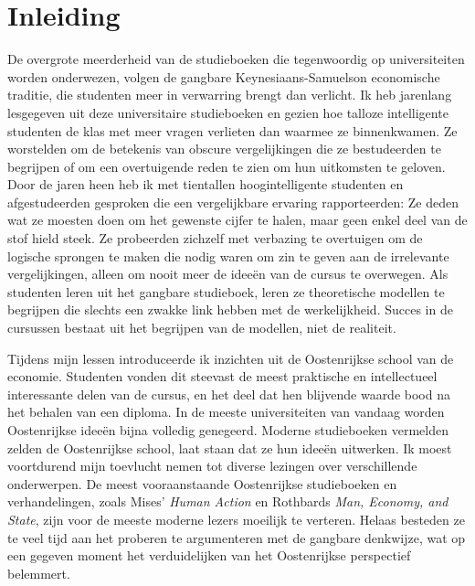\chapter{Inleiding}

De overgrote meerderheid van de studieboeken die tegenwoordig op universiteiten worden onderwezen, volgen de gangbare Keynesiaans-Samuelson economische traditie, die studenten meer in verwarring brengt dan verlicht. Ik heb jarenlang lesgegeven uit deze universitaire studieboeken en gezien hoe talloze intelligente studenten de klas met meer vragen verlieten dan waarmee ze binnenkwamen. Ze worstelden om de betekenis van obscure vergelijkingen die ze bestudeerden te begrijpen of om een overtuigende reden te zien om hun uitkomsten te geloven. Door de jaren heen heb ik met tientallen hoogintelligente studenten en afgestudeerden gesproken die een vergelijkbare ervaring rapporteerden: Ze deden wat ze moesten doen om het gewenste cijfer te halen, maar geen enkel deel van de stof hield steek. Ze probeerden zichzelf met verbazing te overtuigen om de logische sprongen te maken die nodig waren om zin te geven aan de irrelevante vergelijkingen, alleen om nooit meer de ideeën van de cursus te overwegen. Als studenten leren uit het gangbare studieboek, leren ze theoretische modellen te begrijpen die slechts een zwakke link hebben met de werkelijkheid. Succes in de cursussen bestaat uit het begrijpen van de modellen, niet de realiteit.

Tijdens mijn lessen introduceerde ik inzichten uit de Oostenrijkse school van de economie. Studenten vonden dit steevast de meest praktische en intellectueel interessante delen van de cursus, en het deel dat hen blijvende waarde bood na het behalen van een diploma. In de meeste universiteiten van vandaag worden Oostenrijkse ideeën bijna volledig genegeerd. Moderne studieboeken vermelden zelden de Oostenrijkse school, laat staan dat ze hun ideeën uitwerken. Ik moest voortdurend mijn toevlucht nemen tot diverse lezingen over verschillende onderwerpen. De meest vooraanstaande Oostenrijkse studieboeken en verhandelingen, zoals Mises' \textit{Human Action} en Rothbards \textit{Man, Economy, and State}, zijn voor de meeste moderne lezers moeilijk te verteren. Helaas besteden ze te veel tijd aan het proberen te argumenteren met de gangbare denkwijze, wat op een gegeven moment het verduidelijken van het Oostenrijkse perspectief belemmert.

